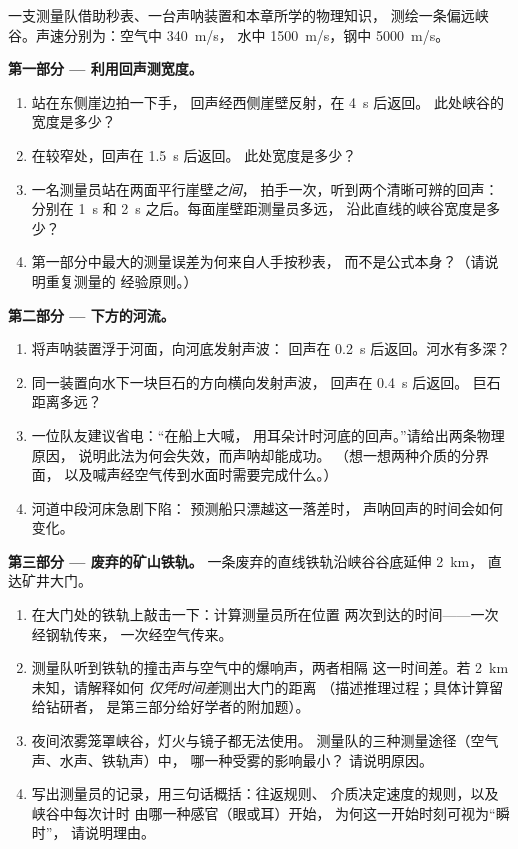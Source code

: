 \begin{problem}\label{pb:g7:sound-production:1}
一支测量队借助秒表、一台声呐装置和本章所学的物理知识，
测绘一条偏远峡谷。声速分别为：空气中 \qty{340}{m/s}，
水中 \qty{1500}{m/s}，钢中 \qty{5000}{m/s}。

\medskip\noindent\textbf{第一部分 --- 利用回声测宽度。}
\begin{enumerate}
  \item 站在东侧崖边拍一下手，
        回声经西侧崖壁反射，在 \qty{4}{s} 后返回。
        此处峡谷的宽度是多少？
  \item 在较窄处，回声在 \qty{1.5}{s} 后返回。
        此处宽度是多少？
  \item 一名测量员站在两面平行崖壁\emph{之间}，
        拍手一次，听到两个清晰可辨的回声：分别在
        \qty{1}{s} 和 \qty{2}{s} 之后。每面崖壁距测量员多远，
        沿此直线的峡谷宽度是多少？
  \item 第一部分中最大的测量误差为何来自人手按秒表，
        而不是公式本身？（请说明重复测量的
        经验原则。）
\end{enumerate}

\medskip\noindent\textbf{第二部分 --- 下方的河流。}
\begin{enumerate}[resume]
  \item 将声呐装置浮于河面，向河底发射声波：
        回声在 \qty{0.2}{s} 后返回。河水有多深？
  \item 同一装置向水下一块巨石的方向横向发射声波，
        回声在 \qty{0.4}{s} 后返回。
        巨石距离多远？
  \item 一位队友建议省电：“在船上大喊，
        用耳朵计时河底的回声。”请给出两条物理原因，
        说明此法为何会失效，而声呐却能成功。
        （想一想两种介质的分界面，
        以及喊声经空气传到水面时需要完成什么。）
  \item 河道中段河床急剧下陷：
        预测船只漂越这一落差时，
        声呐回声的时间会如何变化。
\end{enumerate}

\medskip\noindent\textbf{第三部分 --- 废弃的矿山铁轨。}
一条废弃的直线铁轨沿峡谷谷底延伸 \qty{2}{km}，
直达矿井大门。
\begin{enumerate}[resume]
  \item 在大门处的铁轨上敲击一下：计算测量员所在位置
        两次到达的时间——一次经钢轨传来，
        一次经空气传来。
  \item 测量队听到铁轨的撞击声与空气中的爆响声，两者相隔
        这一时间差。若 \qty{2}{km} 未知，请解释如何
        \emph{仅凭时间差}测出大门的距离
        （描述推理过程；具体计算留给钻研者，
        是第三部分给好学者的附加题）。
  \item 夜间浓雾笼罩峡谷，灯火与镜子都无法使用。
        测量队的三种测量途径（空气声、水声、铁轨声）中，
        哪一种受雾的影响最小？
        请说明原因。
  \item 写出测量员的记录，用三句话概括：往返规则、
        介质决定速度的规则，以及峡谷中每次计时
        由哪一种感官（眼或耳）开始，
        为何这一开始时刻可视为“瞬时”，
        请说明理由。
\end{enumerate}
\end{problem}
